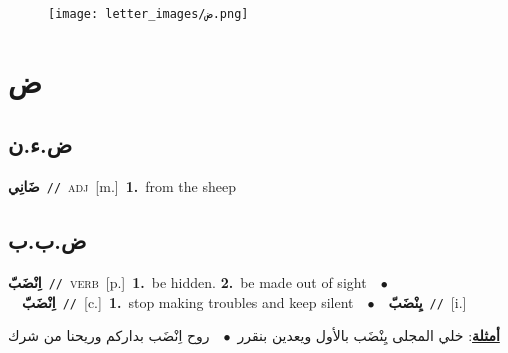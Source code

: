 \documentclass[10pt,a4paper,twoside]{article} %
\begin{document}
\begin{figure*}[t!]\centering\texttt{[image: letter\_images/ض.png]}\end{figure*}
\color{white}

 \section*{\foreignlanguage{arabic}{ض}} 
 \begin{multicols}{2} 

%
\color{black}
\vspace{-3mm}
\subsection*{\color{blue}\foreignlanguage{arabic}{ض.ء.ن}\color{blue}{}} 

{\setlength\topsep{0pt}\textbf{\foreignlanguage{arabic}{ضَانِي}}\ {\color{gray}\texttt{//}\color{black}}\ \textsc{adj}\ [m.]\ \textbf{1.}~from the sheep\ } \vspace{2mm}

\vspace{-3mm}
\subsection*{\color{blue}\foreignlanguage{arabic}{ض.ب.ب}\color{blue}{}} 

{\setlength\topsep{0pt}\textbf{\foreignlanguage{arabic}{اِنْضَبّ}}\ {\color{gray}\texttt{//}\color{black}}\ \textsc{verb}\ [p.]\ \textbf{1.}~be hidden.  \textbf{2.}~be made out of sight\ \ $\bullet$\ \ \setlength\topsep{0pt}\textbf{\foreignlanguage{arabic}{اِنْضَبّ}}\ {\color{gray}\texttt{//}\color{black}}\ [c.]\ \textbf{1.}~stop making troubles and keep silent\ \ $\bullet$\ \ \setlength\topsep{0pt}\textbf{\foreignlanguage{arabic}{يِنْضَبّ}}\ {\color{gray}\texttt{//}\color{black}}\ [i.]\  \begin{flushright}\color{gray}\foreignlanguage{arabic}{\textbf{\underline{\foreignlanguage{arabic}{أمثلة}}}: خلي المجلى يِنْضَب بالأول ويعدين بنقرر\ $\bullet$\ \  روح اِنْضَب بداركم وريحنا من شرك}\end{flushright}\color{black}} \vspace{2mm}


\end{multicols}
\end{document}
